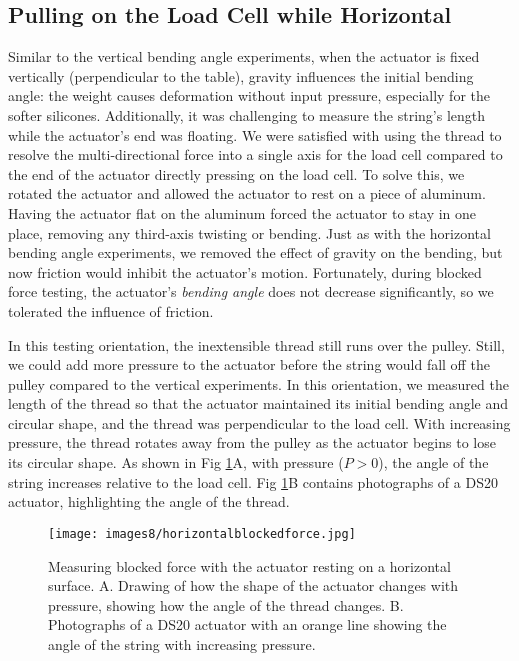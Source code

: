 \clearpage
\subsection{Pulling on the Load Cell while Horizontal}

Similar to the vertical bending angle experiments, when the actuator is fixed vertically (perpendicular to the table), gravity influences the initial bending angle: the weight causes deformation without input pressure, especially for the softer silicones. Additionally, it was challenging to measure the string's length while the actuator's end was floating. We were satisfied with using the thread to resolve the multi-directional force into a single axis for the load cell compared to the end of the actuator directly pressing on the load cell. To solve this, we rotated the actuator and allowed the actuator to rest on a piece of aluminum. Having the actuator flat on the aluminum forced the actuator to stay in one place, removing any third-axis twisting or bending. Just as with the horizontal bending angle experiments, we removed the effect of gravity on the bending, but now friction would inhibit the actuator's motion. Fortunately, during blocked force testing, the actuator's \emph{bending angle} does not decrease significantly, so we tolerated the influence of friction. 

In this testing orientation, the inextensible thread still runs over the pulley. Still, we could add more pressure to the actuator before the string would fall off the pulley compared to the vertical experiments. In this orientation, we measured the length of the thread so that the actuator maintained its initial bending angle and circular shape, and the thread was perpendicular to the load cell. With increasing pressure, the thread rotates away from the pulley as the actuator begins to lose its circular shape. As shown in Fig \ref{fig:horizontalblockedforce}A, with pressure ($P > 0$), the angle of the string increases relative to the load cell. Fig \ref{fig:horizontalblockedforce}B contains photographs of a DS20 actuator, highlighting the angle of the thread. 

\begin{figure}[ht]
    \centering
     \texttt{[image: images8/horizontalblockedforce.jpg]}
    \caption{Measuring blocked force with the actuator resting on a horizontal surface. A. Drawing of how the shape of the actuator changes with pressure, showing how the angle of the thread changes. B. Photographs of a DS20 actuator with an orange line showing the angle of the string with increasing pressure.}
    \label{fig:horizontalblockedforce}
\end{figure}